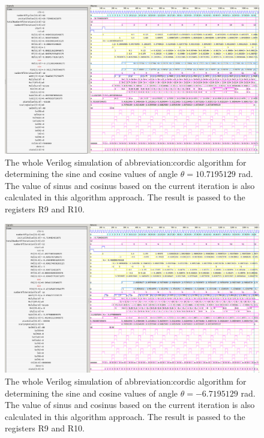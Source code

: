 \documentclass[a4paper, twoside, 11pt]{article}
\begin{document}
        \begin{figure}[htbp!]
            \centering
            \includegraphics[width=1\textwidth]{src/png/inverted/cordic-verilog-whole-sim-10_719.png}
            \caption{The whole Verilog simulation of \gls{abbreviation:cordic} algorithm for determining the sine and cosine values of angle $\theta = 10.7195129$ rad. The value of sinus and cosinus based on the current iteration is also calculated in this algorithm approach. The result is passed to the registers R9 and R10.}
            \label{fig:cordic-verilog-whole-sim-10_719}
        \end{figure}

        \begin{figure}[htbp!]
            \centering
            \includegraphics[width=1\textwidth]{src/png/inverted/cordic-verilog-whole-sim_minus_6_7195129.png}
            \caption{The whole Verilog simulation of \gls{abbreviation:cordic} algorithm for determining the sine and cosine values of angle $\theta = - 6.7195129$ rad. The value of sinus and cosinus based on the current iteration is also calculated in this algorithm approach. The result is passed to the registers R9 and R10.}
            \label{fig:cordic-verilog-whole-sim_minus_6_7195129}
        \end{figure}
\end{document}
